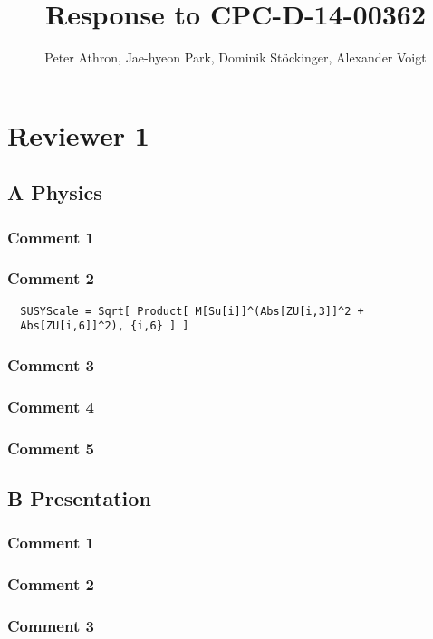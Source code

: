 \documentclass[a4paper,11pt,twocolumn]{article}
\title{Response to CPC-D-14-00362}
\author{Peter Athron, Jae-hyeon Park, Dominik St\"ockinger, Alexander Voigt}
\begin{document}
\maketitle

\section{Reviewer 1}
\subsection{A Physics}
\subsubsection{Comment 1}

\subsubsection{Comment 2}
\begin{lstlisting}
  SUSYScale = Sqrt[ Product[ M[Su[i]]^(Abs[ZU[i,3]]^2 +
  Abs[ZU[i,6]]^2), {i,6} ] ]
\end{lstlisting}

\subsubsection{Comment 3}

\subsubsection{Comment 4}

\subsubsection{Comment 5}

\subsection{B Presentation}

\subsubsection{Comment 1}
\subsubsection{Comment 2}
\subsubsection{Comment 3}
\end{document}
